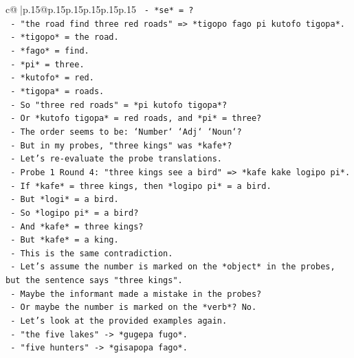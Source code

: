 \documentclass{article}
\begin{document}
{\begin{supertabular}{c@{$\;$}|p{.15\linewidth}@{}p{.15\linewidth}p{.15\linewidth}p{.15\linewidth}p{.15\linewidth}p{.15\linewidth}}
{{{\texttt{            {-} *se* = ?} \\
\texttt{          {-} "the road find three red roads" => *tigopo fago pi kutofo tigopa*.} \\
\texttt{            {-} *tigopo* = the road.} \\
\texttt{            {-} *fago* = find.} \\
\texttt{            {-} *pi* = three.} \\
\texttt{            {-} *kutofo* = red.} \\
\texttt{            {-} *tigopa* = roads.} \\
\texttt{            {-} So "three red roads" = *pi kutofo tigopa*?} \\
\texttt{            {-} Or *kutofo tigopa* = red roads, and *pi* = three?} \\
\texttt{            {-} The order seems to be: `Number` `Adj` `Noun`?} \\
\texttt{            {-} But in my probes, "three kings" was *kafe*?} \\
\texttt{            {-} Let's re{-}evaluate the probe translations.} \\
\texttt{            {-} Probe 1 Round 4: "three kings see a bird" => *kafe kake logipo pi*.} \\
\texttt{              {-} If *kafe* = three kings, then *logipo pi* = a bird.} \\
\texttt{              {-} But *logi* = a bird.} \\
\texttt{              {-} So *logipo pi* = a bird?} \\
\texttt{              {-} And *kafe* = three kings?} \\
\texttt{              {-} But *kafe* = a king.} \\
\texttt{              {-} This is the same contradiction.} \\
\texttt{            {-} Let's assume the number is marked on the *object* in the probes, but the sentence says "three kings".} \\
\texttt{            {-} Maybe the informant made a mistake in the probes?} \\
\texttt{            {-} Or maybe the number is marked on the *verb*? No.} \\
\texttt{            {-} Let's look at the provided examples again.} \\
\texttt{            {-} "the five lakes" {-}> *gugepa fugo*.} \\
\texttt{            {-} "five hunters" {-}> *gisapopa fago*.} \\
}}}
\end{supertabular}}
\end{document}
